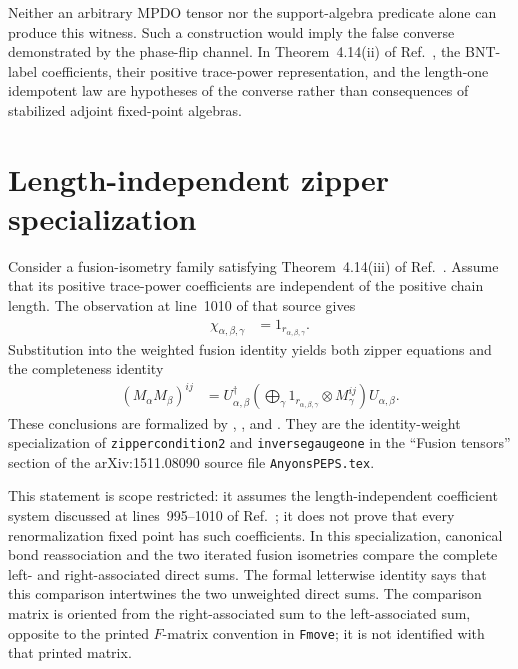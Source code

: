 \documentclass{article}
\begin{document}
Neither an arbitrary MPDO tensor nor the support-algebra predicate alone can
produce this witness. Such a construction would imply the false converse
demonstrated by the phase-flip channel. In Theorem~4.14(ii) of
Ref.~\cite{Cirac2016MPDO_arXiv}, the BNT-label coefficients, their positive
trace-power representation, and the length-one idempotent law are hypotheses
of the converse rather than consequences of stabilized adjoint fixed-point
algebras.

\section{Length-independent zipper specialization}

Consider a fusion-isometry family satisfying Theorem~4.14(iii) of
Ref.~\cite{Cirac2016MPDO_arXiv}. Assume that its positive trace-power
coefficients are independent of the positive chain length. The observation at
line~1010 of that source gives
\begin{align}
    \chi_{\alpha,\beta,\gamma}
        &= 1_{r_{\alpha,\beta,\gamma}}.
\label{eq:cpgsv17_blocked_chi_uniformity_length_independent_chi}
\end{align}
Substitution into the weighted fusion identity yields both zipper equations
and the completeness identity
\begin{align}
    (M_\alpha M_\beta)^{ij}
        &=
        U_{\alpha,\beta}^\dagger
        \left(\bigoplus_\gamma
            1_{r_{\alpha,\beta,\gamma}}\otimes M_\gamma^{ij}\right)
        U_{\alpha,\beta}.
\label{eq:cpgsv17_blocked_chi_uniformity_unweighted_fusion_identity}
\end{align}
These conclusions are formalized by
,
,
and
.
They are the identity-weight specialization of
\texttt{zippercondition2} and \texttt{inversegaugeone} in the ``Fusion
tensors'' section of the arXiv:1511.08090 source file
\texttt{AnyonsPEPS.tex}.

This statement is scope restricted: it assumes the length-independent
coefficient system discussed at lines~995--1010 of
Ref.~\cite{Cirac2016MPDO_arXiv}; it does not prove that every renormalization
fixed point has such coefficients. In this specialization, canonical bond
reassociation and the two iterated fusion isometries compare the complete
left- and right-associated direct sums. The formal letterwise identity says
that this comparison intertwines the two unweighted direct sums. The
comparison matrix is oriented from the right-associated sum to the
left-associated sum, opposite to the printed $F$-matrix convention in
\texttt{Fmove}; it is not identified with that printed matrix.
\end{document}
